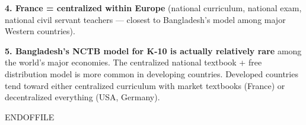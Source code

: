 \textbf{4. France = centralized within Europe} (national curriculum, national exam, national civil servant teachers --- closest to Bangladesh's model among major Western countries).

\textbf{5. Bangladesh's NCTB model for K-10 is actually relatively rare} among the world's major economies. The centralized national textbook + free distribution model is more common in developing countries. Developed countries tend toward either centralized curriculum with market textbooks (France) or decentralized everything (USA, Germany).


ENDOFFILE
